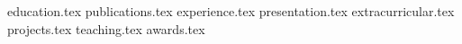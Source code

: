 \documentclass[letterpaper,11pt]{article}
\begin{document}


{education.tex}
{publications.tex}
{experience.tex}
{presentation.tex}
{extracurricular.tex}
{projects.tex}
{teaching.tex}
{awards.tex}
\end{document}
